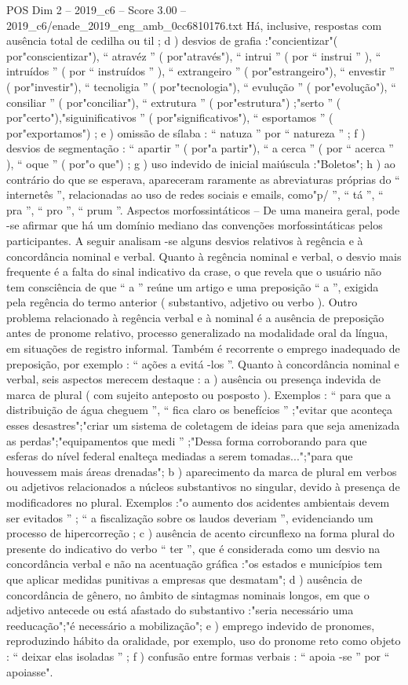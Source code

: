 \begin{textsample}{POS Dim 2 – 2019\_c6 – Score 3.00 – 2019\_c6/enade\_2019\_eng\_amb\_0cc6810176.txt}
Há, inclusive, respostas com ausência total de cedilha ou til ; d ) desvios de grafia :"concientizar"( por"conscientizar"), “ atravéz ” ( por"através"), “ intrui ” ( por “ instrui ” ), “ intruídos ” ( por “ instruídos ” ), “ extrangeiro ” ( por"estrangeiro"), “ envestir ” ( por"investir"), “ tecnoligia ” ( por"tecnologia"), “ evulução ” ( por"evolução"), “ consiliar ” ( por"conciliar"), “ extrutura ” ( por"estrutura") ;"serto ” ( por"certo"),"siguinificativos ” ( por"significativos"), “ esportamos ” ( por"exportamos") ; e ) omissão de sílaba : “ natuza ” por “ natureza ” ; f ) desvios de segmentação : “ apartir ” ( por"a partir"), “ a cerca ” ( por “ acerca ” ), “ oque ” ( por"o que") ; g ) uso indevido de inicial maiúscula :"Boletos"; h ) ao contrário do que se esperava, apareceram raramente as abreviaturas próprias do “ internetês ”, relacionadas ao uso de redes sociais e emails, como"p/ ”, “ tá ”, “ pra ”, “ pro ”, “ prum ”.
Aspectos morfossintáticos – De uma maneira geral, pode -se afirmar que há um domínio mediano das convenções morfossintáticas pelos participantes.
A seguir analisam -se alguns desvios relativos à regência e à concordância nominal e verbal.
Quanto à regência nominal e verbal, o desvio mais frequente é a falta do sinal indicativo da crase, o que revela que o usuário não tem consciência de que “ a ” reúne um artigo e uma preposição “ a ”, exigida pela regência do termo anterior ( substantivo, adjetivo ou verbo ).
Outro problema relacionado à regência verbal e à nominal é a ausência de preposição antes de pronome relativo, processo generalizado na modalidade oral da língua, em situações de registro informal.
Também é recorrente o emprego inadequado de preposição, por exemplo : “ ações a evitá -los ”.
Quanto à concordância nominal e verbal, seis aspectos merecem destaque : a ) ausência ou presença indevida de marca de plural ( com sujeito anteposto ou posposto ).
Exemplos : “ para que a distribuição de água cheguem ”, “ fica claro os benefícios ” ;"evitar que aconteça esses desastres";"criar um sistema de coletagem de ideias para que seja amenizada as perdas";"equipamentos que medi ” ;"Dessa forma corroborando para que esferas do nível federal enalteça mediadas a serem tomadas...";"para que houvessem mais áreas drenadas"; b ) aparecimento da marca de plural em verbos ou adjetivos relacionados a núcleos substantivos no singular, devido à presença de modificadores no plural.
Exemplos :"o aumento dos acidentes ambientais devem ser evitados ” ; “ a fiscalização sobre os laudos deveriam ”, evidenciando um processo de hipercorreção ; c ) ausência de acento circunflexo na forma plural do presente do indicativo do verbo “ ter ”, que é considerada como um desvio na concordância verbal e não na acentuação gráfica :"os estados e municípios tem que aplicar medidas punitivas a empresas que desmatam"; d ) ausência de concordância de gênero, no âmbito de sintagmas nominais longos, em que o adjetivo antecede ou está afastado do substantivo :"seria necessário uma reeducação";"é necessário a mobilização"; e ) emprego indevido de pronomes, reproduzindo hábito da oralidade, por exemplo, uso do pronome reto como objeto : “ deixar elas isoladas ” ; f ) confusão entre formas verbais : “ apoia -se ” por “ apoiasse".

\end{textsample}
